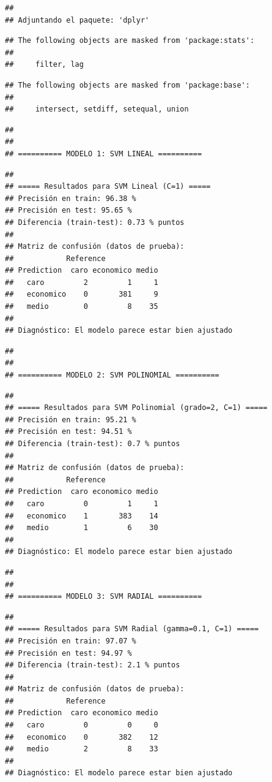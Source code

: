 \documentclass[
]{article}
\begin{document}
\begin{verbatim}
## 
## Adjuntando el paquete: 'dplyr'
\end{verbatim}

\begin{verbatim}
## The following objects are masked from 'package:stats':
## 
##     filter, lag
\end{verbatim}

\begin{verbatim}
## The following objects are masked from 'package:base':
## 
##     intersect, setdiff, setequal, union
\end{verbatim}

\begin{verbatim}
## 
## 
## ========== MODELO 1: SVM LINEAL ==========
\end{verbatim}

\begin{verbatim}
## 
## ===== Resultados para SVM Lineal (C=1) =====
## Precisión en train: 96.38 %
## Precisión en test: 95.65 %
## Diferencia (train-test): 0.73 % puntos
## 
## Matriz de confusión (datos de prueba):
##            Reference
## Prediction  caro economico medio
##   caro         2         1     1
##   economico    0       381     9
##   medio        0         8    35
## 
## Diagnóstico: El modelo parece estar bien ajustado
\end{verbatim}

\begin{verbatim}
## 
## 
## ========== MODELO 2: SVM POLINOMIAL ==========
\end{verbatim}

\begin{verbatim}
## 
## ===== Resultados para SVM Polinomial (grado=2, C=1) =====
## Precisión en train: 95.21 %
## Precisión en test: 94.51 %
## Diferencia (train-test): 0.7 % puntos
## 
## Matriz de confusión (datos de prueba):
##            Reference
## Prediction  caro economico medio
##   caro         0         1     1
##   economico    1       383    14
##   medio        1         6    30
## 
## Diagnóstico: El modelo parece estar bien ajustado
\end{verbatim}

\begin{verbatim}
## 
## 
## ========== MODELO 3: SVM RADIAL ==========
\end{verbatim}

\begin{verbatim}
## 
## ===== Resultados para SVM Radial (gamma=0.1, C=1) =====
## Precisión en train: 97.07 %
## Precisión en test: 94.97 %
## Diferencia (train-test): 2.1 % puntos
## 
## Matriz de confusión (datos de prueba):
##            Reference
## Prediction  caro economico medio
##   caro         0         0     0
##   economico    0       382    12
##   medio        2         8    33
## 
## Diagnóstico: El modelo parece estar bien ajustado
\end{verbatim}
\end{document}
